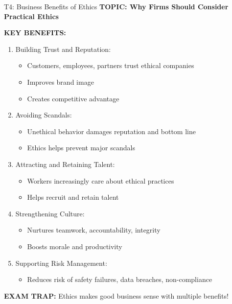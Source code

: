 \documentclass[8pt]{beamer}
\begin{document}
	\begin{frame}{T4: Business Benefits of Ethics}
		\fontsize{6.5}{7.5}\selectfont
		\textbf{TOPIC: Why Firms Should Consider Practical Ethics}
		
		\vspace{0.1cm}
		\textbf{KEY BENEFITS:}
		\begin{enumerate}
			\item \textcolor{myblue}{Building Trust and Reputation:}
			\begin{itemize}
				\item Customers, employees, partners trust ethical companies
				\item Improves brand image
				\item Creates competitive advantage
			\end{itemize}
			\item \textcolor{myblue}{Avoiding Scandals:}
			\begin{itemize}
				\item Unethical behavior damages reputation and bottom line
				\item Ethics helps prevent major scandals
			\end{itemize}
			\item \textcolor{myblue}{Attracting and Retaining Talent:}
			\begin{itemize}
				\item Workers increasingly care about ethical practices
				\item Helps recruit and retain talent
			\end{itemize}
			\item \textcolor{myblue}{Strengthening Culture:}
			\begin{itemize}
				\item Nurtures teamwork, accountability, integrity
				\item Boosts morale and productivity
			\end{itemize}
			\item \textcolor{myblue}{Supporting Risk Management:}
			\begin{itemize}
				\item Reduces risk of safety failures, data breaches, non-compliance
			\end{itemize}
		\end{enumerate}
		
		\textcolor{myred}{\textbf{EXAM TRAP:}} Ethics makes \textcolor{myblue}{good business sense} with multiple benefits!
	\end{frame}
	
\end{document}
